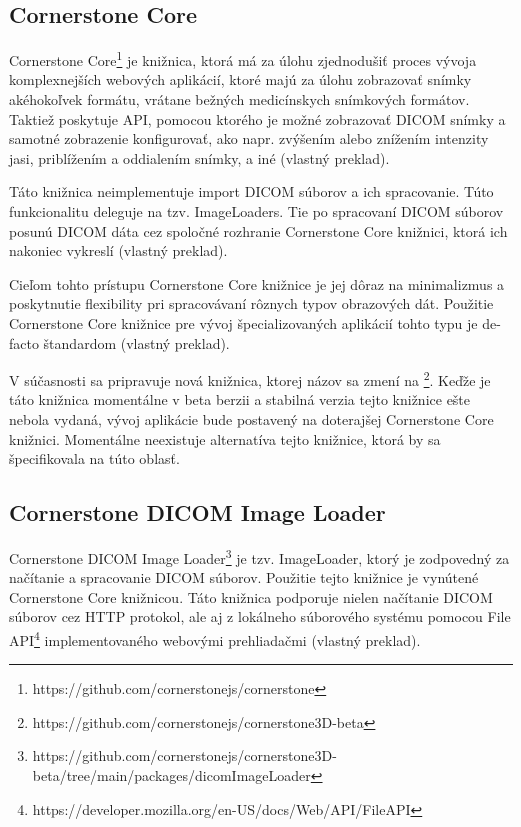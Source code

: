 \subsection {Cornerstone Core}
Cornerstone Core\footnote{https://github.com/cornerstonejs/cornerstone} je knižnica, ktorá má za úlohu zjednodušiť proces vývoja komplexnejších webových aplikácií, ktoré majú za úlohu zobrazovať snímky akéhokoľvek formátu, vrátane bežných medicínskych snímkových formátov. Taktiež poskytuje API, pomocou ktorého je možné zobrazovať DICOM snímky a samotné zobrazenie konfigurovať, ako napr. zvýšením alebo znížením intenzity jasi, priblížením a oddialením snímky, a iné \cite{about_cornerstone_core} (vlastný preklad).

Táto knižnica neimplementuje import DICOM súborov a ich spracovanie. Túto funkcionalitu deleguje na tzv. ImageLoaders. Tie po spracovaní DICOM súborov posunú DICOM dáta cez spoločné rozhranie Cornerstone Core knižnici, ktorá ich nakoniec vykreslí \cite{about_cornerstone_core} (vlastný preklad).

Cieľom tohto prístupu Cornerstone Core knižnice je jej dôraz na minimalizmus a poskytnutie flexibility pri spracovávaní rôznych typov obrazových dát. Použitie Cornerstone Core knižnice pre vývoj špecializovaných aplikácií tohto typu je de-facto štandardom \cite{about_cornerstone_core} (vlastný preklad).

V súčasnosti sa pripravuje nová  knižnica, ktorej názov sa zmení na \footnote{https://github.com/cornerstonejs/cornerstone3D-beta}. Keďže je táto knižnica momentálne v beta berzii a stabilná verzia tejto knižnice ešte nebola vydaná, vývoj aplikácie bude postavený na doterajšej Cornerstone Core knižnici.
Momentálne neexistuje alternatíva tejto knižnice, ktorá by sa špecifikovala na túto oblasť.

\subsection {Cornerstone DICOM Image Loader}
Cornerstone DICOM Image Loader\footnote{https://github.com/cornerstonejs/cornerstone3D-beta/tree/main/packages/dicomImageLoader} je tzv. ImageLoader, ktorý je zodpovedný za načítanie a spracovanie DICOM súborov. Použitie tejto knižnice je vynútené Cornerstone Core knižnicou. Táto knižnica podporuje nielen načítanie DICOM súborov cez HTTP protokol, ale aj z lokálneho súborového systému pomocou File API\footnote{https://developer.mozilla.org/en-US/docs/Web/API/File\textunderscore API} implementovaného webovými prehliadačmi \cite{about_cornerstone_dicom_image_loader} (vlastný preklad).

